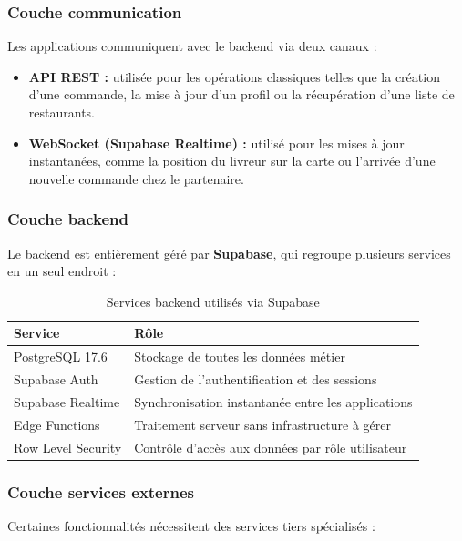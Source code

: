 \documentclass[12pt,fleqn,a4paper]{report}
\begin{document}
\begin{justify}
\subsubsection{Couche communication}
Les applications communiquent avec le backend via deux canaux :

\begin{itemize}
    \item \textbf{API REST :} utilisée pour les opérations classiques
    telles que la création d'une commande, la mise à jour d'un profil
    ou la récupération d'une liste de restaurants.

    \item \textbf{WebSocket (Supabase Realtime) :} utilisé pour les
    mises à jour instantanées, comme la position du livreur sur la
    carte ou l'arrivée d'une nouvelle commande chez le partenaire.
\end{itemize}

\subsubsection{Couche backend}
Le backend est entièrement géré par \textbf{Supabase}, qui regroupe
plusieurs services en un seul endroit :

\begin{table}[H]
\centering
\renewcommand{\arraystretch}{1.4}
\begin{tabular}{|l|l|}
\hline
\textbf{Service} & \textbf{Rôle} \\
\hline
PostgreSQL 17.6 & Stockage de toutes les données métier \\
\hline
Supabase Auth & Gestion de l'authentification et des sessions \\
\hline
Supabase Realtime & Synchronisation instantanée entre les applications \\
\hline
Edge Functions & Traitement serveur sans infrastructure à gérer \\
\hline
Row Level Security & Contrôle d'accès aux données par rôle utilisateur \\
\hline
\end{tabular}
\caption{Services backend utilisés via Supabase}
\end{table}

\subsubsection{Couche services externes}
Certaines fonctionnalités nécessitent des services tiers
spécialisés :


\end{justify}
\end{document}
